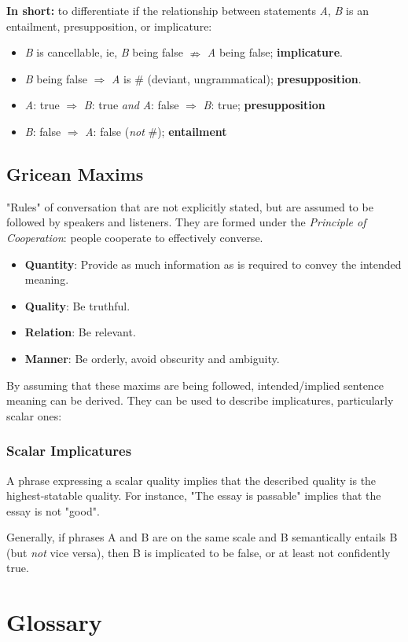 \documentclass[12pt]{article}
\begin{document}
\textbf{In short:} to differentiate if the relationship between statements \textit{A}, \textit{B} is an entailment, presupposition, or implicature:

\begin{itemize}
  \item \textit{B} is cancellable, ie, \textit{B} being false ${\nRightarrow}$ \textit{A} being false; \textbf{implicature}.
  \item \textit{B} being false $\Rightarrow$ \textit{A} is \# (deviant, ungrammatical); \textbf{presupposition}.
  \item \textit{A}: true $\Rightarrow$ \textit{B}: true \textit{and} \textit{A}: false $\Rightarrow$ \textit{B}: true; \textbf{presupposition}
  \item \textit{B}: false $\Rightarrow$ \textit{A}: false (\textit{not} \#); \textbf{entailment}
\end{itemize}

\subsection{Gricean Maxims}

\begin{definitionEnd}
  "Rules" of conversation that are not explicitly stated, but are assumed to be followed by speakers and listeners. They are formed under the \emph{Principle of Cooperation}: people cooperate to effectively converse.
\end{definitionEnd}

\begin{itemize}
  \item \textbf{Quantity}: Provide as much information as is required to convey the intended meaning.
  \item \textbf{Quality}: Be truthful.
  \item \textbf{Relation}: Be relevant.
  \item \textbf{Manner}: Be orderly, avoid obscurity and ambiguity.
\end{itemize}

By assuming that these maxims are being followed, intended/implied sentence meaning can be derived. They can be used to describe implicatures, particularly scalar ones:

\subsubsection{Scalar Implicatures}

A phrase expressing a scalar quality implies that the described quality is the highest-statable quality. For instance, "The essay is passable" implies that the essay is not "good".

Generally, if phrases A and B are on the same scale and B semantically entails B (but \textit{not} vice versa), then B is implicated to be false, or at least not confidently true.


\newpage
\section{Glossary}
\printProofs
\end{document}
